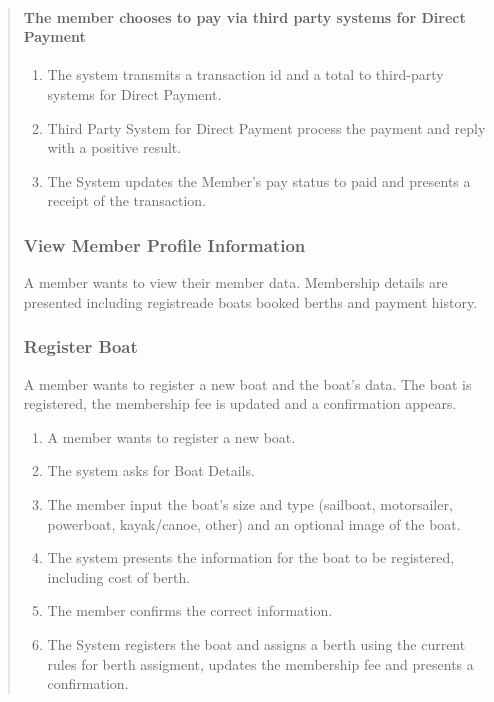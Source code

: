\begin{quote}
\paragraph{The member chooses to pay via third party systems for Direct Payment}
\begin{enumerate}
  \tightlist
  \item
    The system transmits a transaction id and a total to third-party systems
    for Direct Payment.
  \item
    Third Party System for Direct Payment process the payment and reply with
    a positive result.
  \item
    The System updates the Member's pay status to paid and presents a receipt
    of the transaction.
\end{enumerate}



\subsubsection{View Member Profile Information}\label{usecase3}

A member wants to view their member data. Membership details are presented
including registreade boats booked berths and payment history.


\subsubsection{Register Boat}\label{usecase4}

A member wants to register a new boat and the boat's data. The boat is
registered, the membership fee is updated and a confirmation appears.

\begin{enumerate}
  \tightlist
  \item
    A member wants to register a new boat.
  \item
    The system asks for Boat Details.
  \item
    The member input the boat's size and type (sailboat, motorsailer,
    powerboat, kayak/canoe, other) and an optional image of the boat.
  \item
    The system presents the information for the boat to be registered,
    including cost of berth.
  \item
    The member confirms the correct information.
  \item
    The System registers the boat and assigns a berth using the current rules
    for berth assigment, updates the membership fee and presents a confirmation.
\end{enumerate}


\end{quote}

